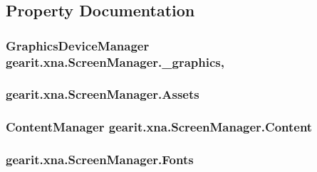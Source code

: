 \subsection{Property Documentation}
\hypertarget{classgearit_1_1xna_1_1_screen_manager_af28162340e4c887907fccaf3c72ac340}{
\subsubsection[{\+\_\+graphics}]{\setlength{\rightskip}{0pt plus 5cm}Graphics\+Device\+Manager gearit.\+xna.\+Screen\+Manager.\+\_\+graphics\hspace{0.3cm}{\ttfamily [get]}, {\ttfamily [set]}}}\label{classgearit_1_1xna_1_1_screen_manager_af28162340e4c887907fccaf3c72ac340}
\hypertarget{classgearit_1_1xna_1_1_screen_manager_acaba5204f0760a8b79dfa76767606916}{
\subsubsection[{Assets}]{ gearit.\+xna.\+Screen\+Manager.\+Assets\hspace{0.3cm}{\ttfamily [get]}}}\label{classgearit_1_1xna_1_1_screen_manager_acaba5204f0760a8b79dfa76767606916}
\hypertarget{classgearit_1_1xna_1_1_screen_manager_ae7549a2962bc3ac38e9fb9bada36dd96}{
\subsubsection[{Content}]{\setlength{\rightskip}{0pt plus 5cm}Content\+Manager gearit.\+xna.\+Screen\+Manager.\+Content\hspace{0.3cm}{\ttfamily [get]}}}\label{classgearit_1_1xna_1_1_screen_manager_ae7549a2962bc3ac38e9fb9bada36dd96}
\hypertarget{classgearit_1_1xna_1_1_screen_manager_ab09910d193f633cde8668f431482dd93}{
\subsubsection[{Fonts}]{ gearit.\+xna.\+Screen\+Manager.\+Fonts\hspace{0.3cm}{\ttfamily [get]}}}\label{classgearit_1_1xna_1_1_screen_manager_ab09910d193f633cde8668f431482dd93}
